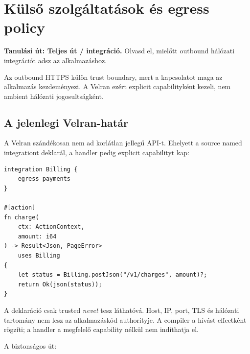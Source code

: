 \chapter{Külső szolgáltatások és egress policy}

\noindent\textbf{Tanulási út: Teljes út / integráció.} Olvasd el, mielőtt outbound hálózati integrációt adsz az alkalmazáshoz.\par\medskip



Az outbound HTTPS külön trust boundary, mert a kapcsolatot maga az alkalmazás kezdeményezi. A Velran ezért explicit capabilityként kezeli, nem ambient hálózati jogosultságként.

\section{A jelenlegi Velran-határ}

A Velran szándékosan nem ad korlátlan  jellegű API-t. Ehelyett a source named integrationt deklarál, a handler pedig explicit capabilityt kap:

\begin{lstlisting}[language=Velran]
integration Billing {
    egress payments
}

#[action]
fn charge(
    ctx: ActionContext,
    amount: i64
) -> Result<Json, PageError>
    uses Billing
{
    let status = Billing.postJson("/v1/charges", amount)?;
    return Ok(json(status));
}
\end{lstlisting}

A deklaráció csak trusted \emph{nevet} tesz láthatóvá. Host, IP, port, TLS és hálózati tartomány nem lesz az alkalmazáskód authorityje. A compiler a hívást  effectként rögzíti; a handler a megfelelő  capability nélkül nem indíthatja el.

A biztonságos út:

